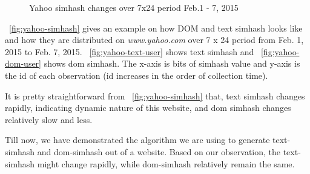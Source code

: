 \begin{figure}[t]
  \centering
  \caption{Yahoo simhash changes over 7x24 period Feb.1 - 7, 2015}
  \label{fig:yahoo-simhash}
\end{figure}

~\autoref{fig:yahoo-simhash} gives an example on how DOM and text simhash looks
like and how they are distributed on {\it www.yahoo.com} over 7 x 24 period from
Feb. 1, 2015 to Feb. 7, 2015. ~\autoref{fig:yahoo-text-user} shows text simhash
and ~\autoref{fig:yahoo-dom-user} shows dom simhash. The x-axis is bits of simhash value and
y-axis is the id of each observation (id increases in the order of collection time).

It is pretty straightforward from ~\autoref{fig:yahoo-simhash} that,
text simhash changes rapidly, indicating dynamic nature of this
website, and dom simhash changes relatively slow and less.

Till now, we have demonstrated the algorithm we are using to generate
text-simhash and dom-simhash out of a website. Based on our observation, the
text-simhash might change rapidly, while dom-simhash relatively remain the same.

